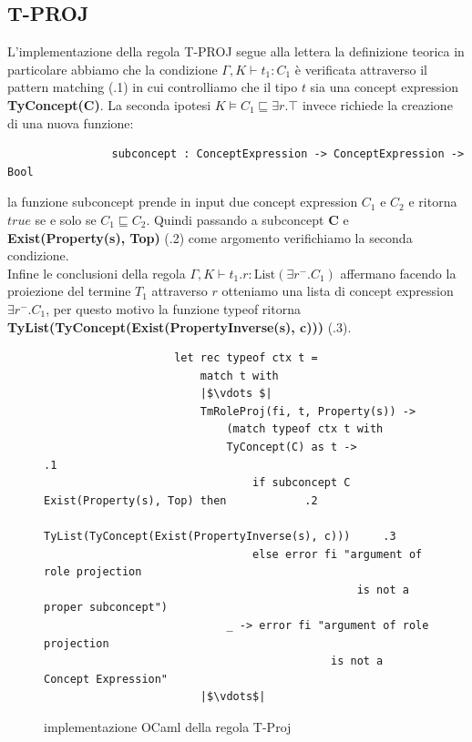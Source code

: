         \subsection{T-PROJ}
            L'implementazione della regola T-PROJ segue alla lettera la definizione teorica in particolare abbiamo che la condizione $\Gamma,K \vdash t_1 : C_1$
            è verificata attraverso il pattern matching (.1) in cui controlliamo che il tipo $t$ sia una concept expression \textbf{TyConcept(C)}. La seconda ipotesi
            $K \vDash C_1 \sqsubseteq \exists r . \top$ invece richiede la creazione di una nuova funzione:
            \begin{verbatim}
                subconcept : ConceptExpression -> ConceptExpression -> Bool
            \end{verbatim}
            la funzione subconcept prende in input due concept expression $C_1$ e $C_2$ e ritorna $true$ se e solo se $C_1 \sqsubseteq C_2$. Quindi passando a subconcept
            \textbf{C} e \textbf{Exist(Property(s), Top)} (.2) come argomento verifichiamo la seconda condizione.
            \\Infine le conclusioni della regola $\Gamma,K \vdash t_1.r : \textrm{List}(\exists r^- . C_1)$ affermano facendo la proiezione del termine $T_1$ attraverso $r$
            otteniamo una lista di concept expression $\exists r^- . C_1$, per questo motivo la funzione typeof ritorna  \textbf{TyList(TyConcept(Exist(PropertyInverse(s), c)))} (.3).
            \begin{figure}[h] 
                \begin{verbatim}
                    let rec typeof ctx t =
                        match t with
                        |$\vdots $|
                        TmRoleProj(fi, t, Property(s)) ->
                            (match typeof ctx t with
                            TyConcept(C) as t ->                                        .1
                                if subconcept C Exist(Property(s), Top) then            .2
                                    TyList(TyConcept(Exist(PropertyInverse(s), c)))     .3
                                else error fi "argument of role projection 
                                                is not a proper subconcept")
                            _ -> error fi "argument of role projection 
                                            is not a Concept Expression"
                        |$\vdots$|
                \end{verbatim}
            \caption{implementazione OCaml della regola T-Proj}
            \end{figure}

